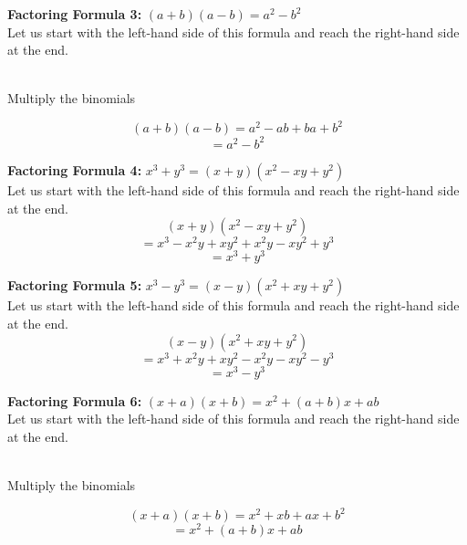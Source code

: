 \begin{framed}
  \noindent \textbf{Factoring Formula 3:} $(a+b)(a-b)=a^2-b^2$\\
  \noindent Let us start with the left-hand side of this formula and reach the 
  right-hand side at the end.\\\\
  \centerline {Multiply the binomials}
  \begin{equation*}
    (a+b)(a-b)=a^2-ab+ba+b^2
  \end{equation*}
  \begin{equation*}
    =a^2-b^2
  \end{equation*}
\end{framed}

\begin{framed}
  \noindent \textbf{Factoring Formula 4:} $x^3+y^3=(x+y)(x^2-xy+y^2)$\\
  \noindent Let us start with the left-hand side of this formula and reach the 
  right-hand side at the end.\\
  \begin{equation*}
    (x+y)(x^2-xy+y^2)
  \end{equation*}
  \begin{equation*}
    =x^3-x^2y+xy^2+x^2y-xy^2+y^3
  \end{equation*}
  \begin{equation*}
    =x^3+y^3
  \end{equation*}
\end{framed}


\begin{framed}
  \noindent \textbf{Factoring Formula 5:} $x^3-y^3=(x-y)(x^2+xy+y^2)$\\
  \noindent Let us start with the left-hand side of this formula and reach the 
  right-hand side at the end.\\
  \begin{equation*}
    (x-y)(x^2+xy+y^2)
  \end{equation*}
  \begin{equation*}
    =x^3+x^2y+xy^2-x^2y-xy^2-y^3
  \end{equation*}
  \begin{equation*}
    =x^3-y^3
  \end{equation*}
\end{framed}


\begin{framed}
  \noindent \textbf{Factoring Formula 6:} $(x+a)(x+b)=x^2+(a+b)x+ab$\\
  \noindent Let us start with the left-hand side of this formula and reach the 
  right-hand side at the end.\\\\
  \centerline {Multiply the binomials}
  \begin{equation*}
    (x+a)(x+b)=x^2+xb+ax+b^2
  \end{equation*}
  \begin{equation*}
    =x^2 + (a + b) x + ab
  \end{equation*}
\end{framed}


